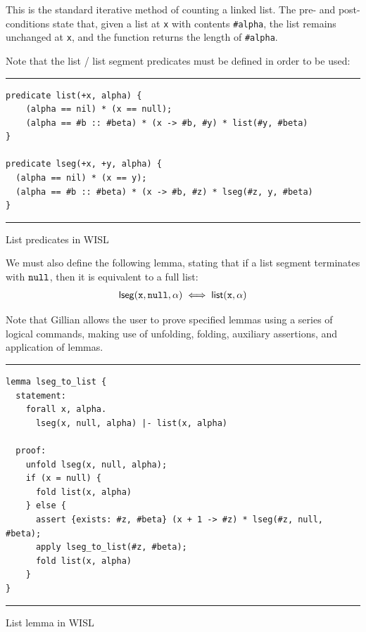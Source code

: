 This is the standard iterative method of counting a linked list. The pre- and
post-conditions state that, given a list at \texttt{x} with contents
\texttt{\#alpha}, the list remains unchanged at \texttt{x}, and the function
returns the length of \texttt{\#alpha}.

Note that the list / list segment predicates must be defined in order to be used:

\begin{listing}[!ht]
\noindent\rule{\textwidth}{0.5pt}
\vspace{-0.6cm}
\begin{verbatim}
predicate list(+x, alpha) {
    (alpha == nil) * (x == null);
    (alpha == #b :: #beta) * (x -> #b, #y) * list(#y, #beta)
}

predicate lseg(+x, +y, alpha) {
  (alpha == nil) * (x == y);
  (alpha == #b :: #beta) * (x -> #b, #z) * lseg(#z, y, #beta)
}
\end{verbatim}
\vspace{-0.4cm}
\noindent\rule{\textwidth}{0.5pt}
\vspace{-0.6cm}
\caption{List predicates in WISL}
\label{lst:list-predicate}
\end{listing}

We must also define the following lemma, stating that if a list segment
terminates with $\mathtt{null}$, then it is equivalent to a full list:
\begin{align*}
  \mathsf{lseg}(\mathtt{x}, \mathtt{null}, \alpha) \iff \mathsf{list}(\mathtt{x}, \alpha)
\end{align*}

Note that Gillian allows the user to prove specified lemmas using a series of
logical commands, making use of unfolding, folding, auxiliary assertions, and
application of lemmas.

\begin{listing}[!ht]
\noindent\rule{\textwidth}{0.5pt}
\vspace{-0.6cm}
\begin{verbatim}
lemma lseg_to_list {
  statement:
    forall x, alpha.
      lseg(x, null, alpha) |- list(x, alpha)

  proof:
    unfold lseg(x, null, alpha);
    if (x = null) {
      fold list(x, alpha)
    } else {
      assert {exists: #z, #beta} (x + 1 -> #z) * lseg(#z, null, #beta);
      apply lseg_to_list(#z, #beta);
      fold list(x, alpha)
    }
}
\end{verbatim}
\vspace{-0.4cm}
\noindent\rule{\textwidth}{0.5pt}
\vspace{-0.6cm}
\caption{List lemma in WISL}
\end{listing}

